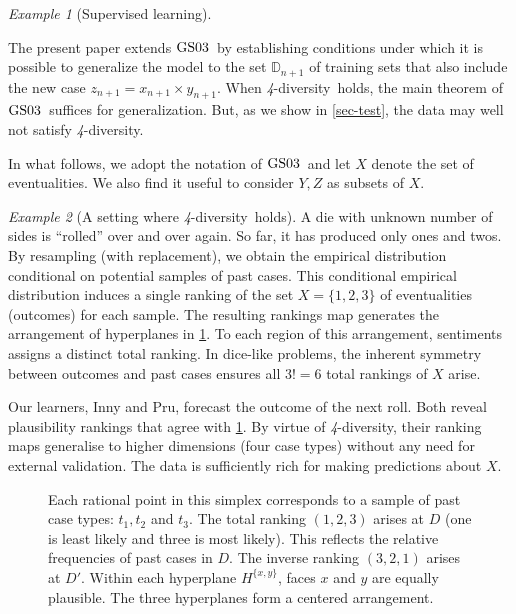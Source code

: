 \documentclass[ecta,nameyear,draft]{econsocart}
\makeatletter
\newcommand{\R}{\mathbb R}
\newcommand{\preceqb}{\mathbin{\preceq}}
\newcommand{\mbbd}{{\mathds D}}
\newcommand{\fourdiv}{\textit{4}-\textup{diversity}}
\newcommand\cf{c\@.f\@ifnextchar.{}{.\@}}
\newcommand{\gsii}{$\textup{GS03}$}
\theoremstyle{plain}
\theoremstyle{remark}
\newtheorem{example}{Example}%
\makeatother
\begin{document}
\begin{example}[Supervised learning]
\begin{enumerate}
  \end{enumerate}
  The present paper extends \gsii\ by establishing conditions under which it is
  possible to generalize the model to the set $\mbbd_{n+1}$ of training sets
  that also include the new case $z_{n+1} = x_{n+1}\times y_{n+1}$. When
  \fourdiv\ holds, the main theorem of \gsii\ suffices for generalization. But,
  as we show in \cref{sec-test}, the data may well not satisfy \fourdiv.
\end{example}

In what follows, we adopt the notation of \gsii\ and let $X$ denote the set of
eventualities. We also find it useful to consider $Y, Z$ as subsets of $X$.
\begin{example}[A setting where \fourdiv\ holds]\label{eg-tali}
  A die with unknown number of sides is ``rolled'' over and
  over again. So far, it has produced only ones and twos. By resampling 
  (with replacement), we obtain the empirical distribution conditional on
  potential samples of past cases. This conditional empirical distribution
  induces a single ranking of the set $X=\{1, 2, 3\}$ of eventualities
  (outcomes) for each sample. The resulting rankings map generates the
  arrangement of hyperplanes in \cref{fig-tali}.  To each region of this
  arrangement, {sentiments} assigns a distinct total ranking.  
  In dice-like problems, the inherent symmetry between outcomes and past cases
  ensures all $3!=6$ total rankings of $X$ arise.
 
  Our learners, Inny and {Pru}, forecast the outcome of the next roll.  Both
  reveal plausibility rankings that agree with \cref{fig-tali}. By virtue of
  \fourdiv, their ranking maps generalise to higher dimensions (four case
  types) without any need for external validation. The data is sufficiently
  rich for making predictions about $X$.
  \begin{figure}
    \centering  \caption{\label{fig-tali} Each
      rational point in this simplex corresponds to a sample of past case
      types: $t_1, t_2$ and $t_3$.  The total ranking $(1, 2, 3)$ arises at $D$
      (one is least likely and three is most likely). This reflects the
      relative frequencies of past cases in $D$.  The inverse ranking $(3, 2,
      1)$ arises at $D'$. Within each hyperplane $H^{\{x,y\}}$, faces $x$ and
      $y$ are equally plausible.  The three hyperplanes form a centered
    arrangement.}
  \end{figure}
\end{example}
\end{document}
